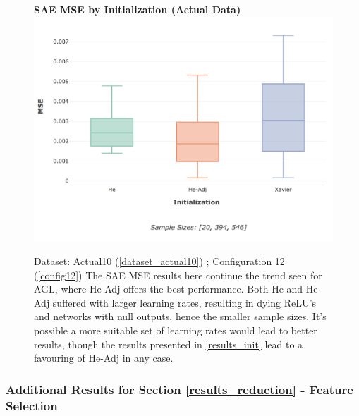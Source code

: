 \documentclass[a4paper,11pt,oneside]{article}
\theoremstyle{plain}
\theoremstyle{definition}
\begin{document}
\begin{figure}[H]
	\centering 
	\textbf{SAE MSE by Initialization (Actual Data)} 
	\includegraphics[scale=0.3]{images/results/newinit/actual_mse_init.png}
	\caption[SAE MSE by Initialization (Actual Data)]{Dataset: Actual10 (\ref{dataset_actual10}) ; Configuration 12 (\ref{config12})
		\newline The SAE MSE results here continue the trend seen for AGL, where He-Adj offers the best performance. Both He and He-Adj suffered with larger learning rates, resulting in dying ReLU's and networks with null outputs, hence the smaller sample sizes. It's possible a more suitable set of learning rates would lead to better results, though the results presented in \ref{results_init} lead to a favouring of He-Adj in any case.}
	\label{figure-actual_mse_init}
\end{figure}


\subsubsection{Additional Results for Section \ref{results_reduction} - Feature Selection }\label{results_features_appendix}
\end{document}
